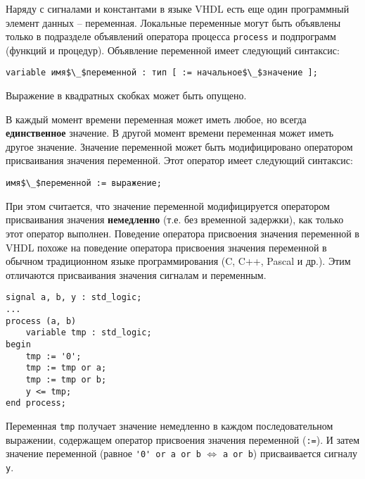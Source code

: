 Наряду с сигналами и константами в языке VHDL есть еще один программный элемент данных – переменная. Локальные переменные могут быть объявлены только в подразделе объявлений оператора процесса \lstinline?process? и подпрограмм (функций и процедур). Объявление переменной имеет следующий синтаксис:

\begin{Code}
\begin{lstlisting}[mathescape]
variable имя$\_$переменной : тип [ := начальное$\_$значение ];
\end{lstlisting}
\end{Code}

Выражение в квадратных скобках может быть опущено.

В каждый момент времени переменная может иметь любое, но всегда \textbf{единственное} значение. В другой момент времени переменная может иметь другое значение. Значение переменной может быть модифицировано оператором присваивания значения переменной. Этот оператор имеет следующий синтаксис:

\begin{Code}
\begin{lstlisting}[mathescape]
 имя$\_$переменной := выражение;
\end{lstlisting}
\end{Code}

При этом считается, что значение переменной модифицируется оператором присваивания значения \textbf{немедленно} (т.е. без временной задержки), как только этот оператор выполнен. Поведение оператора присвоения значения переменной в VHDL похоже на поведение оператора присвоения значения переменной в обычном традиционном языке программирования (C, C++, Pascal и др.). Этим отличаются присваивания значения сигналам и переменным.


\begin{Code}
\begin{lstlisting}
signal a, b, y : std_logic;
...
process (a, b)
    variable tmp : std_logic;
begin
    tmp := '0';
    tmp := tmp or a;
    tmp := tmp or b;
    y <= tmp;
end process;
\end{lstlisting}
\end{Code}

Переменная \lstinline?tmp? получает значение немедленно в каждом последовательном выражении, содержащем оператор присвоения значения переменной (\lstinline?:=?). И затем значение переменной (равное \lstinline?'0' or a or b? $\Leftrightarrow$ \lstinline?a or b?) присваивается сигналу \lstinline?y?.

